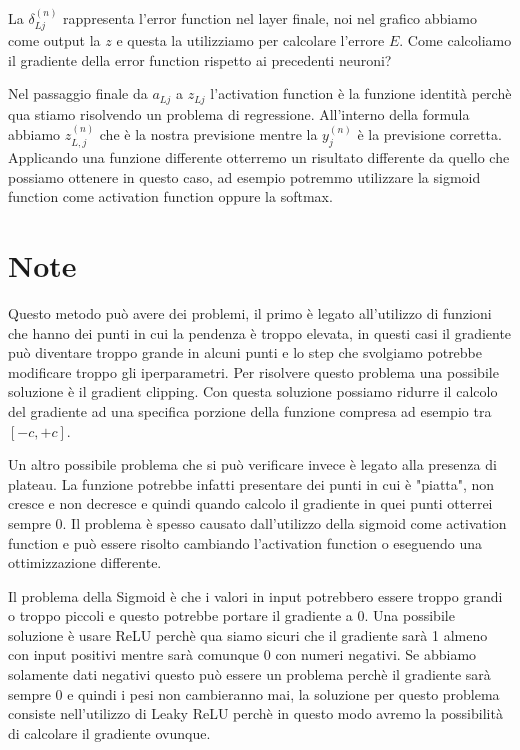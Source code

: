 \documentclass[14pt]{extreport}
\begin{document}
La $\delta_{Lj}^{(n)}$ rappresenta l'error function nel layer finale, noi nel grafico abbiamo come output la $z$ e questa la utilizziamo per calcolare
l'errore $E$. Come calcoliamo il gradiente della error function rispetto ai precedenti neuroni?

Nel passaggio finale da $a_{Lj}$ a $z_{Lj}$ l'activation function è la funzione identità perchè qua stiamo risolvendo un problema di regressione.
All'interno della formula abbiamo $z_{L,j}^{(n)}$ che è la nostra previsione mentre la $y_j^{(n)}$ è la previsione corretta. Applicando una funzione
differente otterremo un risultato differente da quello che possiamo ottenere in questo caso, ad esempio potremmo utilizzare la sigmoid function come
activation function oppure la softmax.


\section{Note}

Questo metodo può avere dei problemi, il primo è legato all'utilizzo di funzioni che hanno dei punti in cui la pendenza è troppo elevata, in questi
casi il gradiente può diventare troppo grande in alcuni punti e lo step che svolgiamo potrebbe modificare troppo gli iperparametri. Per risolvere
questo problema una possibile soluzione è il gradient clipping. Con questa soluzione possiamo ridurre il calcolo del gradiente ad una specifica
porzione della funzione compresa ad esempio tra $[-c,+c]$.

Un altro possibile problema che si può verificare invece è legato alla presenza di plateau. La funzione potrebbe infatti presentare dei punti in cui è
"piatta", non cresce e non decresce e quindi quando calcolo il gradiente in quei punti otterrei sempre 0. Il problema è spesso causato dall'utilizzo
della sigmoid come activation function e può essere risolto cambiando l'activation function o eseguendo una ottimizzazione differente.

Il problema della Sigmoid è che i valori in input potrebbero essere troppo grandi o troppo piccoli e questo potrebbe portare il gradiente a 0. Una
possibile soluzione è usare ReLU perchè qua siamo sicuri che il gradiente sarà 1 almeno con input positivi mentre sarà comunque 0 con numeri negativi.
Se abbiamo solamente dati negativi questo può essere un problema perchè il gradiente sarà sempre 0 e quindi i pesi non cambieranno mai, la soluzione
per questo problema consiste nell'utilizzo di Leaky ReLU perchè in questo modo avremo la possibilità di calcolare il gradiente ovunque.
\end{document}
